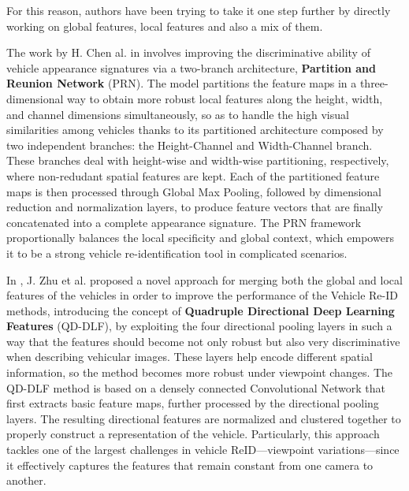 For this reason, authors have been trying to take it one step further by directly working on global features, local features and also a mix of them. 

The work by H. Chen al. in \cite{VehicleReID_3} involves improving the discriminative ability of vehicle appearance signatures via a two-branch architecture, \textbf{Partition and Reunion Network} (PRN). The model partitions the feature maps in a three-dimensional way to obtain more robust local features along the height, width, and channel dimensions simultaneously, so as to handle the high visual similarities among vehicles thanks to its partitioned architecture composed by two independent branches: the Height-Channel and Width-Channel branch. These branches deal with height-wise and width-wise partitioning, respectively, where non-redudant spatial features are kept. Each of the partitioned feature maps is then processed through Global Max Pooling, followed by dimensional reduction and normalization layers, to produce feature vectors that are finally concatenated into a complete appearance signature.
The PRN framework proportionally balances the local specificity and global context, which empowers it to be a strong vehicle re-identification tool in complicated scenarios.

In \cite{VehicleReID_1}, J. Zhu et al. proposed a novel approach for merging both the global and local features of the vehicles in order to improve the performance of the Vehicle Re-ID methods, introducing the concept of \textbf{Quadruple Directional Deep Learning Features} (QD-DLF), by exploiting the four directional pooling layers in such a way that the features should become not only robust but also very discriminative when describing vehicular images. These layers help encode different spatial information, so the method becomes more robust under viewpoint changes.
The QD-DLF method is based on a densely connected Convolutional Network that first extracts basic feature maps, further processed by the directional pooling layers. The resulting directional features are normalized and clustered together to properly construct a representation of the vehicle. Particularly, this approach tackles one of the largest challenges in vehicle ReID—viewpoint variations—since it effectively captures the features that remain constant from one camera to another. 

